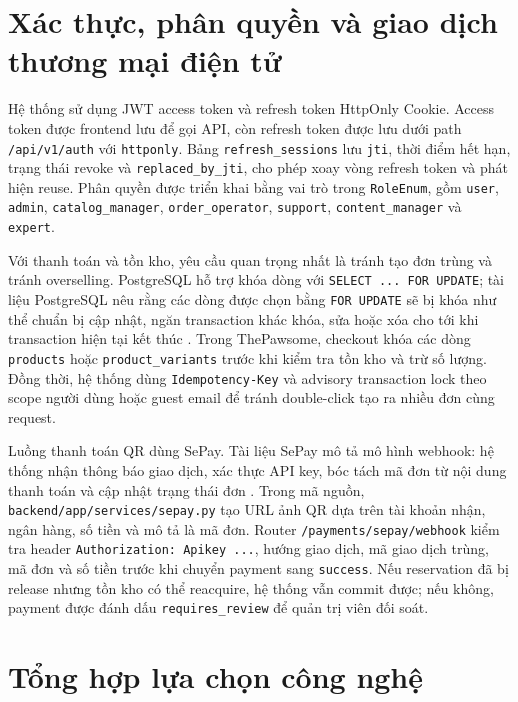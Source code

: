 \documentclass[../DoAn.tex]{subfiles}
\begin{document}
\section{Xác thực, phân quyền và giao dịch thương mại điện tử}
\label{section:3.5}

Hệ thống sử dụng JWT access token và refresh token HttpOnly Cookie. Access token được frontend lưu để gọi API, còn refresh token được lưu dưới path \texttt{/api/v1/auth} với \texttt{httponly}. Bảng \texttt{refresh\_sessions} lưu \texttt{jti}, thời điểm hết hạn, trạng thái revoke và \texttt{replaced\_by\_jti}, cho phép xoay vòng refresh token và phát hiện reuse. Phân quyền được triển khai bằng vai trò trong \texttt{RoleEnum}, gồm \texttt{user}, \texttt{admin}, \texttt{catalog\_manager}, \texttt{order\_operator}, \texttt{support}, \texttt{content\_manager} và \texttt{expert}.

Với thanh toán và tồn kho, yêu cầu quan trọng nhất là tránh tạo đơn trùng và tránh overselling. PostgreSQL hỗ trợ khóa dòng với \texttt{SELECT ... FOR UPDATE}; tài liệu PostgreSQL nêu rằng các dòng được chọn bằng \texttt{FOR UPDATE} sẽ bị khóa như thể chuẩn bị cập nhật, ngăn transaction khác khóa, sửa hoặc xóa cho tới khi transaction hiện tại kết thúc \cite{postgresExplicitLocking}. Trong ThePawsome, checkout khóa các dòng \texttt{products} hoặc \texttt{product\_variants} trước khi kiểm tra tồn kho và trừ số lượng. Đồng thời, hệ thống dùng \texttt{Idempotency-Key} và advisory transaction lock theo scope người dùng hoặc guest email để tránh double-click tạo ra nhiều đơn cùng request.

Luồng thanh toán QR dùng SePay. Tài liệu SePay mô tả mô hình webhook: hệ thống nhận thông báo giao dịch, xác thực API key, bóc tách mã đơn từ nội dung thanh toán và cập nhật trạng thái đơn \cite{sepayDocs}. Trong mã nguồn, \texttt{backend/app/services/sepay.py} tạo URL ảnh QR dựa trên tài khoản nhận, ngân hàng, số tiền và mô tả là mã đơn. Router \texttt{/payments/sepay/webhook} kiểm tra header \texttt{Authorization: Apikey ...}, hướng giao dịch, mã giao dịch trùng, mã đơn và số tiền trước khi chuyển payment sang \texttt{success}. Nếu reservation đã bị release nhưng tồn kho có thể reacquire, hệ thống vẫn commit được; nếu không, payment được đánh dấu \texttt{requires\_review} để quản trị viên đối soát.

\section{Tổng hợp lựa chọn công nghệ}
\label{section:3.6}
\end{document}
